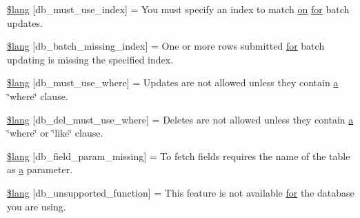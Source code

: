 \begin{DoxyCompactItemize}
\item 
\hyperlink{_admin_2system_2language_2english_2db__lang_8php_a708419b6b94728c30474ee5fdde3b99b}{\$lang} \mbox{[}\textquotesingle{}db\+\_\+must\+\_\+use\+\_\+index\textquotesingle{}\mbox{]} = \textquotesingle{}You must specify an index to match \hyperlink{how_to_play_8js_af1f111425a03a603c02a2abf44ad8c43}{on} \hyperlink{confirm__transfer_8php_aaf007b9fa5c90d7c5a7011bece9cfc15}{for} batch updates.\textquotesingle{}
\item 
\hyperlink{_admin_2system_2language_2english_2db__lang_8php_af946769a3dd5679c60e6f2ef5f7a5aa1}{\$lang} \mbox{[}\textquotesingle{}db\+\_\+batch\+\_\+missing\+\_\+index\textquotesingle{}\mbox{]} = \textquotesingle{}One or more rows submitted \hyperlink{confirm__transfer_8php_aaf007b9fa5c90d7c5a7011bece9cfc15}{for} batch updating is missing the specified index.\textquotesingle{}
\item 
\hyperlink{_admin_2system_2language_2english_2db__lang_8php_add4bfc65af76fda2c48fa6a2e8d2e506}{\$lang} \mbox{[}\textquotesingle{}db\+\_\+must\+\_\+use\+\_\+where\textquotesingle{}\mbox{]} = \textquotesingle{}Updates are not allowed unless they contain \hyperlink{_admin_2assets_2js_2bootstrap_8min_8js_a1f5870dcf487187f13d5fd328ed9e6e7}{a} \char`\"{}where\char`\"{} clause.\textquotesingle{}
\item 
\hyperlink{_admin_2system_2language_2english_2db__lang_8php_a256ae2de791e589ddc23012f74f390ea}{\$lang} \mbox{[}\textquotesingle{}db\+\_\+del\+\_\+must\+\_\+use\+\_\+where\textquotesingle{}\mbox{]} = \textquotesingle{}Deletes are not allowed unless they contain \hyperlink{_admin_2assets_2js_2bootstrap_8min_8js_a1f5870dcf487187f13d5fd328ed9e6e7}{a} \char`\"{}where\char`\"{} or \char`\"{}like\char`\"{} clause.\textquotesingle{}
\item 
\hyperlink{_admin_2system_2language_2english_2db__lang_8php_a9101352a8cd8c8f34a6b8b1e30c45d8a}{\$lang} \mbox{[}\textquotesingle{}db\+\_\+field\+\_\+param\+\_\+missing\textquotesingle{}\mbox{]} = \textquotesingle{}To fetch fields requires the name of the table as \hyperlink{_admin_2assets_2js_2bootstrap_8min_8js_a1f5870dcf487187f13d5fd328ed9e6e7}{a} parameter.\textquotesingle{}
\item 
\hyperlink{_admin_2system_2language_2english_2db__lang_8php_a77c256be8532e23e8463481f51732116}{\$lang} \mbox{[}\textquotesingle{}db\+\_\+unsupported\+\_\+function\textquotesingle{}\mbox{]} = \textquotesingle{}This feature is not available \hyperlink{confirm__transfer_8php_aaf007b9fa5c90d7c5a7011bece9cfc15}{for} the database you are using.\textquotesingle{}

\end{DoxyCompactItemize}
